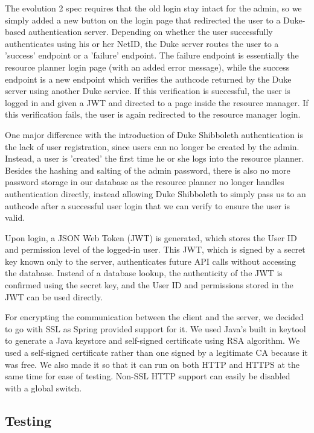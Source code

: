 \documentclass[12pt]{article}
\begin{document}
The evolution 2 spec requires that the old login stay intact for the admin, so we simply added a new button on the login page that redirected the user to a Duke-based authentication server. Depending on whether the user successfully authenticates using his or her NetID, the Duke server routes the user to a 'success' endpoint or a 'failure' endpoint. The failure endpoint is essentially the resource planner login page (with an added error message), while the success endpoint is a new endpoint which verifies the authcode returned by the Duke server using another Duke service. If this verification is successful, the user is logged in and given a JWT and directed to a page inside the resource manager. If this verification fails, the user is again redirected to the resource manager login. 

One major difference with the introduction of Duke Shibboleth authentication is the lack of user registration, since users can no longer be created by the admin. Instead, a user is 'created' the first time he or she logs into the resource planner. Besides the hashing and salting of the admin password, there is also no more password storage in our database as the resource planner no longer handles authentication directly, instead allowing Duke Shibboleth to simply pass us to an authcode after a successful user login that we can verify to ensure the user is valid. 

Upon login, a JSON Web Token (JWT) is generated, which stores the User ID and permission level of the logged-in user. This JWT, which is signed by a secret key known only to the server, authenticates future API calls without accessing the database. Instead of a database lookup, the authenticity of the JWT is confirmed using the secret key, and the User ID and permissions stored in the JWT can be used directly. 

For encrypting the communication between the client and the server, we decided to go with SSL as Spring provided support for it. We used Java's built in keytool to generate a Java keystore and self-signed certificate using RSA algorithm. We used a self-signed certificate rather than one signed by a legitimate CA because it was free. We also made it so that it can run on both HTTP and HTTPS at the same time for ease of testing. Non-SSL HTTP support can easily be disabled with a global switch.


\subsection{Testing}
\end{document}
